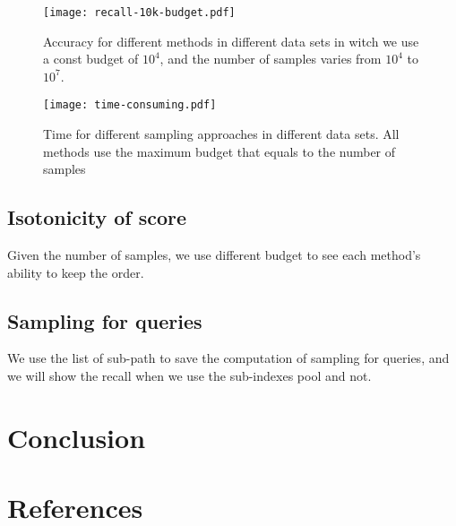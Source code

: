 \documentclass{article}
\begin{document}
\begin{figure}[ht]
  \centering
  \texttt{[image: recall-10k-budget.pdf]}\\
  \caption{Accuracy for different methods in different data sets in witch we use a const budget of $10^4$, and the number of samples varies from $10^4$ to $10^7$.}
  \label{Fig:Recall10kBudget}
\end{figure}

\begin{figure}[ht]
  \centering
  \texttt{[image: time-consuming.pdf]}\\
  \caption{Time for different sampling approaches in different data sets. All methods use the maximum budget that equals to the number of samples}
  \label{Fig:Recall10kBudget}
\end{figure}
\subsection{Isotonicity of score}
Given the number of samples, we use different budget to see each method's ability to keep the order.

\subsection{Sampling for queries}
We use the list of sub-path to save the computation of sampling for queries, and we will show the recall when we use the sub-indexes pool and not.

\section{Conclusion}

\section{References}
\end{document}
